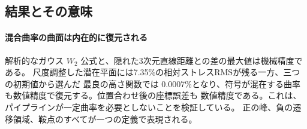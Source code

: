 \subsection{結果とその意味}
\label{sec:results}

\begin{table}[t]
 \centering
 \caption{表現忠実度（上）と有限監査（下）。相対ストレスRMSは
 式~\eqref{eq:reported-stress} である。区間 $[s_-,s_+]$ は厳密計算における
 抽象複体上のすべての内在距離を評価し、$\Delta_i$ は角度変化を足し上げた曲率質量の上界である。
 観測／表示の最小角と三角不等式の余裕を示すことで、平均損失の背後に退化を
 隠さない。曲率誤差は、外部にあるMNISTの正解ではなく、観測された辺上の $W_2$ 長が
 誘導する角欠損曲率に対して測る。}
 \resizebox{0.98\textwidth}{!}{%
 }
 \par\smallskip
 \resizebox{0.98\textwidth}{!}{%
 }
 \label{tab:visualization-results}
\end{table}

\paragraph{混合曲率の曲面は内在的に復元される}
解析的なガウス $W_2$ 公式と、隠れた3次元直線距離との差の最大値は機械精度である。
尺度調整した潜在平面には7.35\%の相対ストレスRMSが残る一方、三つの初期値から選んだ
最良の高さ関数では
0.0007\%となり、符号が混在する曲率も数値精度で復元する。位置合わせ後の座標誤差も
数値精度である。これは、パイプラインが一定曲率を必要としないことを検証している。
正の峰、負の遷移領域、鞍点のすべてが一つの定義で表現される。

